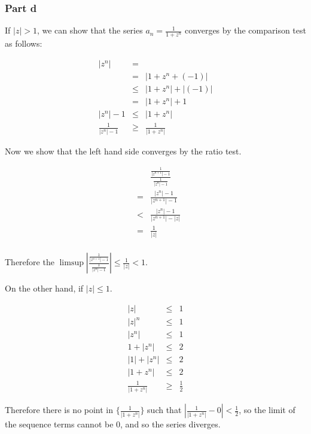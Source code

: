 \subsubsection*{Part d}
If $ |z| > 1 $, we can show that the series $ a_n = \frac{1}{1 + z^n} $ converges by the comparison test as follows:

\begin{eqnarray*}
                |z^n| &=   &  \\
                      &=   & |1 + z^n + (-1)| \\
                      &\le & |1 + z^n| + |(-1)| \\
                      &=   & |1 + z^n| + 1  \\
            |z^n| - 1 &\le & |1 + z^n| \\
  \frac{1}{|z^n| - 1} &\ge & \frac{1}{|1 + z^n|}
\end{eqnarray*}

Now we show that the left hand side converges by the ratio test.

\begin{eqnarray*}
  & & \frac{\frac{1}{|z^{n+1}| - 1}}{\frac{1}{|z^n| - 1}} \\
  &=& \frac{|z^n| - 1}{|z^{n+1}| - 1} \\
  &<& \frac{|z^n| - 1}{|z^{n+1}| - |z|} \\
  &=& \frac{1}{|z|} \\
\end{eqnarray*}

Therefore the $ \limsup \left| \frac{\frac{1}{|z^{n+1}| - 1}}{\frac{1}{|z^n| - 1}} \right| \le \frac{1}{|z|} < 1$.

On the other hand, if $ |z| \le 1 $.

\begin{eqnarray*}
                  |z| &\le& 1 \\
                |z|^n &\le& 1 \\
                |z^n| &\le& 1 \\
            1 + |z^n| &\le& 2 \\
          |1| + |z^n| &\le& 2 \\
            |1 + z^n| &\le& 2 \\
  \frac{1}{|1 + z^n|} &\ge& \frac{1}{2}
\end{eqnarray*}

Therefore there is no point in $ \{ \frac{1}{|1 + z^n|} \} $ such that $ |\frac{1}{|1 + z^n|} - 0| < \frac{1}{2} $, so the limit of the sequence terms cannot be 0, and so the series diverges.
